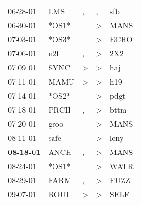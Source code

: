 \begin{supertabular}{p{0.07\textwidth}p{0.06\textwidth}p{0.02\textwidth}p{0.02\textwidth}p{0.06\textwidth}}
          06-28-01\textsuperscript{} &            LMS\textsuperscript{} &                , &                , &            sfb\textsuperscript{} \\
          06-30-01\textsuperscript{} &                            *OS1* &                  &     \textgreater &           MANS\textsuperscript{} \\
          07-03-01\textsuperscript{} &                            *OS3* &                  &     \textgreater &           ECHO\textsuperscript{} \\
          07-06-01\textsuperscript{} &            n2f\textsuperscript{} &                , &     \textgreater &            2X2\textsuperscript{} \\
          07-09-01\textsuperscript{} &           SYNC\textsuperscript{} &     \textgreater &     \textgreater &            haj\textsuperscript{} \\
          07-11-01\textsuperscript{} &           MAMU\textsuperscript{} &     \textgreater &     \textgreater &            h19\textsuperscript{} \\
          07-14-01\textsuperscript{} &                            *OS2* &                  &     \textgreater &           pdgt\textsuperscript{} \\
          07-18-01\textsuperscript{} &           PRCH\textsuperscript{} &                , &     \textgreater &           bttm\textsuperscript{} \\
          07-20-01\textsuperscript{} &           groo\textsuperscript{} &                  &     \textgreater &           MANS\textsuperscript{} \\
          08-11-01\textsuperscript{} &           safe\textsuperscript{} &                  &     \textgreater &           leny\textsuperscript{} \\
 \textbf{08-18-01\textsuperscript{}} &           ANCH\textsuperscript{} &                , &     \textgreater &           MANS\textsuperscript{} \\
          08-24-01\textsuperscript{} &                            *OS1* &                  &     \textgreater &           WATR\textsuperscript{} \\
          08-29-01\textsuperscript{} &           FARM\textsuperscript{} &                , &     \textgreater &           FUZZ\textsuperscript{} \\
          09-07-01\textsuperscript{} &           ROUL\textsuperscript{} &     \textgreater &     \textgreater &           SELF\textsuperscript{} \\

\end{supertabular}
